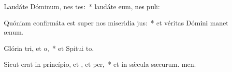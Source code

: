 \item Laudáte Dóminum, nes tes:~* laudáte eum, nes puli:
\item Quóniam confirmáta est super nos miseridia jus:~* et véritas Dómini manet  ænum.
\item Glória tri, et o,~* et Spitui to.
\item Sicut erat in princípio, et , et per,~* et in sǽcula sæcurum. men.
